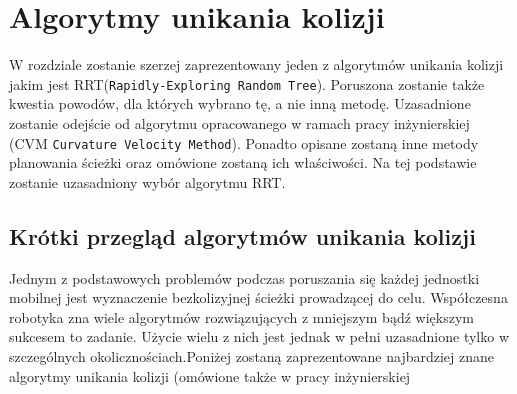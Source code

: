 \chapter{Algorytmy unikania kolizji \label{chap:algorytmy}}
 W rozdziale zostanie szerzej zaprezentowany jeden z algorytmów unikania kolizji jakim jest RRT(\texttt{Rapidly-Exploring Random Tree}).
Poruszona zostanie także kwestia powodów, dla których wybrano tę, a nie inną metodę. Uzasadnione zostanie odejście od algorytmu opracowanego w ramach pracy 
inżynierskiej (CVM \texttt{Curvature Velocity Method}). Ponadto opisane zostaną inne metody planowania ścieżki oraz omówione zostaną ich właściwości. Na tej podstawie zostanie 
uzasadniony wybór algorytmu RRT.

\section{Krótki przegląd algorytmów unikania kolizji}
Jednym z podstawowych problemów podczas poruszania się każdej jednostki mobilnej jest wyznaczenie bezkolizyjnej ścieżki prowadzącej do celu.
Współczesna robotyka zna wiele algorytmów rozwiązujących z mniejszym bądź większym sukcesem to zadanie. Użycie wielu z nich jest jednak w pełni uzasadnione tylko w
szczególnych okolicznościach.Poniżej zostaną zaprezentowane najbardziej znane algorytmy unikania kolizji (omówione także w pracy inżynierskiej \cite{inzynierka}
